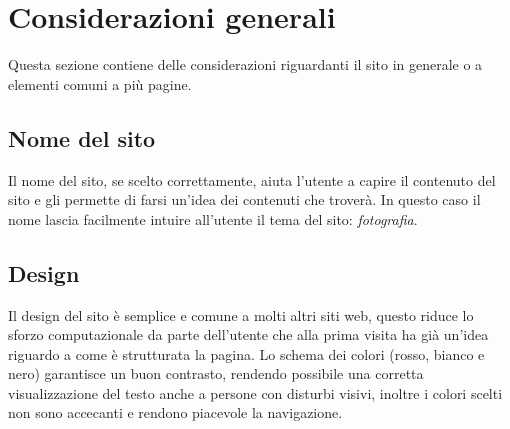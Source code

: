\section{Considerazioni generali}\label{considerazioniGenerali}
Questa sezione contiene delle considerazioni riguardanti il sito in generale o a elementi comuni a più pagine.

\subsection{Nome del sito}%
Il nome del sito, se scelto correttamente, aiuta l'utente a capire il contenuto del sito e gli permette di farsi un'idea dei contenuti che troverà. In questo caso il nome \siteName lascia facilmente intuire all'utente il tema del sito: \textit{fotografia}.

\subsection{Design}%
Il design del sito è semplice e comune a molti altri siti web, questo riduce lo sforzo computazionale da parte dell'utente che alla prima visita ha già un'idea riguardo a come è strutturata la pagina.
Lo schema dei colori (rosso, bianco e nero) garantisce un buon contrasto, rendendo possibile una corretta visualizzazione del testo anche a persone con disturbi visivi, inoltre i colori scelti non sono accecanti e rendono piacevole la navigazione.


